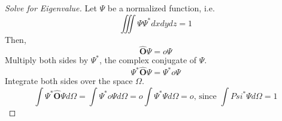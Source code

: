 \begin{proof}[Solve for Eigenvalue] \label{proof:Solve for Eigenvalue}
	Let $\Psi$ be a normalized function, i.e.
	\begin{equation*}
		\iiint \Psi \Psi^{*} dx dy dz =1
	\end{equation*}
	Then,
	\begin{equation*}
		\widehat{\mathbf{O}} \Psi = o \Psi
	\end{equation*}
	Multiply both sides by $\Psi^{*}$, the complex conjugate of $\Psi$.
	\begin{equation*}
		\Psi^{*} \widehat{\mathbf{O}} \Psi = \Psi^{*} o \Psi
	\end{equation*}
	Integrate both sides over the space $\Omega$.
	\begin{equation*}
		\int \Psi^{*} \widehat{\mathbf{O}} \Psi d\Omega = \int \Psi^{*} o \Psi d\Omega
		= o \int \Psi^{*} \Psi d\Omega = o \text{, since } \int Psi^{*} \Psi d\Omega = 1
	\end{equation*}
\end{proof}